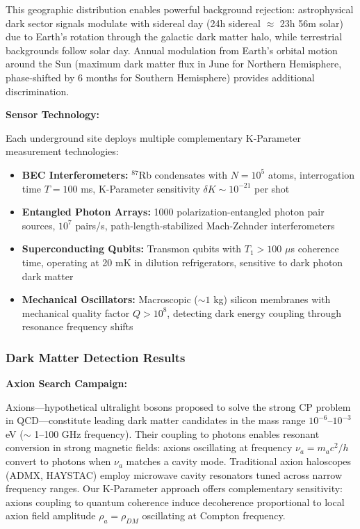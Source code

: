 \documentclass[11pt,a4paper,twoside]{article}
\begin{document}
This geographic distribution enables powerful background rejection: astrophysical dark sector signals modulate with sidereal day (24h sidereal $\approx$ 23h 56m solar) due to Earth's rotation through the galactic dark matter halo, while terrestrial backgrounds follow solar day. Annual modulation from Earth's orbital motion around the Sun (maximum dark matter flux in June for Northern Hemisphere, phase-shifted by 6 months for Southern Hemisphere) provides additional discrimination.

\textbf{Sensor Technology:}

Each underground site deploys multiple complementary K-Parameter measurement technologies:

\begin{itemize}[leftmargin=*]
\item \textbf{BEC Interferometers:} $^{87}$Rb condensates with $N = 10^5$ atoms, interrogation time $T = 100$ ms, K-Parameter sensitivity $\delta K \sim 10^{-21}$ per shot
\item \textbf{Entangled Photon Arrays:} 1000 polarization-entangled photon pair sources, $10^7$ pairs/s, path-length-stabilized Mach-Zehnder interferometers
\item \textbf{Superconducting Qubits:} Transmon qubits with $T_1 > 100$ $\mu$s coherence time, operating at 20 mK in dilution refrigerators, sensitive to dark photon dark matter
\item \textbf{Mechanical Oscillators:} Macroscopic ($\sim 1$ kg) silicon membranes with mechanical quality factor $Q > 10^8$, detecting dark energy coupling through resonance frequency shifts
\end{itemize}

\subsubsection{Dark Matter Detection Results}

\textbf{Axion Search Campaign:}

Axions---hypothetical ultralight bosons proposed to solve the strong CP problem in QCD---constitute leading dark matter candidates in the mass range $10^{-6}$--$10^{-3}$ eV ($\sim$ 1--100 GHz frequency). Their coupling to photons enables resonant conversion in strong magnetic fields: axions oscillating at frequency $\nu_a = m_a c^2 / h$ convert to photons when $\nu_a$ matches a cavity mode. Traditional axion haloscopes (ADMX, HAYSTAC) employ microwave cavity resonators tuned across narrow frequency ranges. Our K-Parameter approach offers complementary sensitivity: axions coupling to quantum coherence induce decoherence proportional to local axion field amplitude $\rho_a = \rho_{DM}$ oscillating at Compton frequency.
\end{document}
